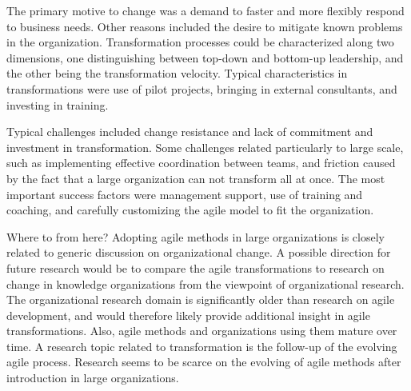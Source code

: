The primary motive to change was a demand to faster and more flexibly respond to
business needs. Other reasons included the desire to mitigate known problems in
the organization.
Transformation processes could be characterized along two dimensions,
one distinguishing between top-down and bottom-up leadership, and the other
being the transformation velocity. Typical characteristics in transformations
were use of pilot projects, bringing in external consultants, and investing in
training.

Typical challenges included change resistance and lack of commitment and
investment in transformation. Some challenges related particularly to large
scale, such as implementing effective coordination between teams, and friction
caused by the fact that a large organization can not transform all at once.
The most important success factors were management support, use of training and
coaching, and carefully customizing the agile model to fit the organization.

Where to from here?
Adopting agile methods in large organizations is closely related to generic
discussion on organizational change. A possible direction for future research
would be to compare the agile transformations to research on change in knowledge
organizations from the viewpoint of organizational research. The organizational
research domain is significantly older than research on agile development, and
would therefore likely provide additional insight in agile transformations.
Also, agile methods and organizations using them mature over time. A research
topic related to transformation is the follow-up of the evolving agile process.
Research seems to be scarce on the evolving of agile methods after introduction
in large organizations.


% 
% 





